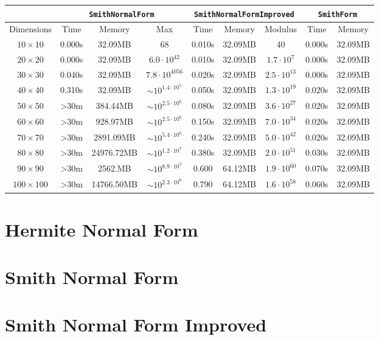 \documentclass[12pt,a4paper]{article}
\theoremstyle{definition}
\begin{document}
\begin{tabular}{|c||c|c|c||c|c|c||c|c|}
  \cline{2-9}
  \multicolumn{1}{c|}{} & \multicolumn{3}{|c|}{\texttt{SmithNormalForm}} & \multicolumn{3}{|c|}{\texttt{SmithNormalFormImproved}} & \multicolumn{2}{|c|}{\texttt{SmithForm}} \\
  \hline
  Dimensions & Time & Memory & Max & Time & Memory & Modulus & Time & Memory \\
  \hline
  $10\times10$ & 0.000s & 32.09MB & 68 & 0.010s & 32.09MB & 40 & 0.000s & 32.09MB \\
  $20\times20$ & 0.000s & 32.09MB & $6.0\cdot10^{42}$ & 0.010s & 32.09MB & $1.7\cdot10^7$ & 0.000s & 32.09MB \\
  $30\times30$ & 0.040s & 32.09MB & $7.8\cdot10^{4056}$ & 0.020s & 32.09MB & $2.5\cdot10^{13}$ & 0.000s & 32.09MB \\
  $40\times40$ & 0.310s & 32.09MB & $\sim10^{1.4\cdot10^5}$ & 0.050s & 32.09MB & $1.3\cdot10^{19}$ & 0.020s & 32.09MB \\
  $50\times50$ & >30m & 384.44MB & $\sim10^{2.5\cdot10^6}$ & 0.080s & 32.09MB & $3.6\cdot10^{27}$ & 0.020s & 32.09MB \\
  $60\times60$ & >30m & 928.97MB & $\sim10^{2.5\cdot10^6}$ & 0.150s & 32.09MB & $7.0\cdot10^{34}$ & 0.020s & 32.09MB \\
  $70\times70$ & >30m & 2891.09MB & $\sim10^{5.4\cdot10^6}$ & 0.240s & 32.09MB & $5.0\cdot10^{42}$ & 0.020s & 32.09MB \\
  $80\times80$ & >30m & 24976.72MB & $\sim10^{1.2\cdot10^7}$ & 0.380s & 32.09MB & $2.0\cdot10^{51}$ & 0.030s & 32.09MB \\
  $90\times90$ & >30m & 2562.MB & $\sim10^{8.9\cdot10^5}$ & 0.600 & 64.12MB & $1.9\cdot10^{60}$ & 0.070s & 32.09MB \\
  $100\times100$ & >30m & 14766.50MB & $\sim10^{2.3\cdot10^6}$ & 0.790 & 64.12MB & $1.6\cdot10^{58}$ & 0.060s & 32.09MB \\
  \hline
\end{tabular}

\appendix

\section{Hermite Normal Form}

\label{hnfcode}



\section{Smith Normal Form}

\label{snfcode}



\section{Smith Normal Form Improved}

\label{snfimprovedcode}



\printbibliography
\end{document}
